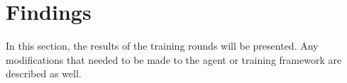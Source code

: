 \section{Findings}
\label{sec:findings}

In this section,
the results of the training rounds will be presented.
%
Any modifications that needed to be made to the agent or training framework
are described as well.









